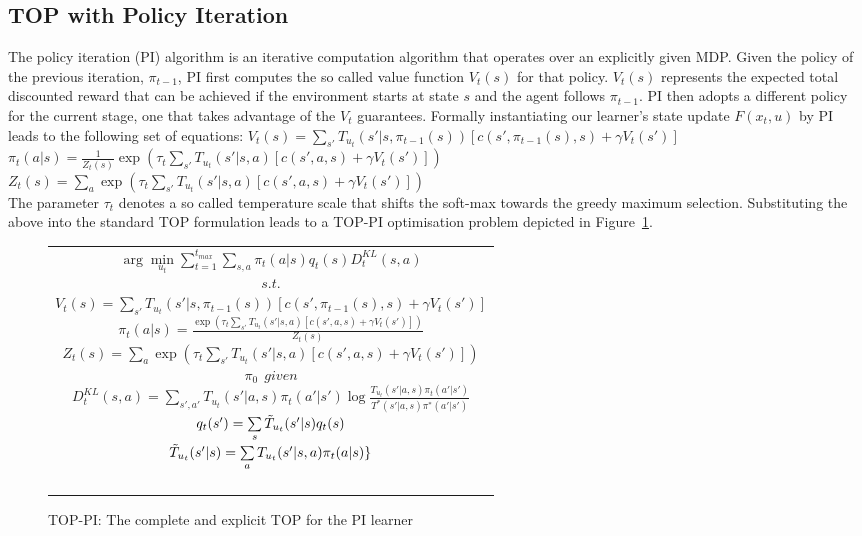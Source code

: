 \documentclass[letterpaper]{aamas2009}
\begin{document}
\subsection{TOP with Policy Iteration}
The policy iteration (PI) algorithm is an iterative computation
algorithm that operates over an explicitly given MDP. Given the policy
of the previous iteration, $\pi_{t-1}$, PI first computes the so
called value function $V_t(s)$ for that policy. $V_t(s)$ represents
the expected total discounted reward that can be achieved if the
environment starts at state $s$ and the agent follows $\pi_{t-1}$. PI
then adopts a different policy for the current stage, one that takes
advantage of the $V_t$ guarantees. Formally instantiating our
learner's state update $F(x_t,u)$ by PI leads to the following set of
equations:
{\center 
$V_t(s)=\sum\limits_{s'}T_{u_t}(s'|s,\pi_{t-1}(s))\left[
c(s',\pi_{t-1}(s),s)+\gamma V_t(s')
\right]$\\
$\pi_t(a|s)=\frac{1}{Z_t(s)}\exp\left(\tau_t\sum\limits_{s'}T_{u_t}(s'|s,a)\left[
c(s',a,s)+\gamma V_t(s')
\right]\right)$\\
$Z_t(s)=\sum\limits_a\exp\left(\tau_t\sum\limits_{s'}T_{u_t}(s'|s,a)\left[
c(s',a,s)+\gamma V_t(s')
\right]\right)$\\
}
The parameter $\tau_t$ denotes a so called temperature scale that
shifts the soft-max towards the greedy maximum selection. Substituting
the above into the standard TOP formulation leads to a TOP-PI
optimisation problem depicted in Figure~\ref{t_opt_PI}.
\begin{figure}[th]
\begin{tabular}{|c|} \hline \parbox{3.2 in} {\center 
$\arg\min\limits_{u_t}\sum\limits_{t=1}^{t_{max}}\sum\limits_{s,a}\pi_t(a|s)q_t(s)D^{KL}_t(s,a)$\\
$s.t.$\\
$V_t(s)=\sum\limits_{s'}T_{u_t}(s'|s,\pi_{t-1}(s))\left[
c(s',\pi_{t-1}(s),s)+\gamma V_t(s')
\right]$\\
$\pi_t(a|s)=\frac{\exp\left(\tau_t\sum\limits_{s'}T_{u_t}(s'|s,a)\left[
c(s',a,s)+\gamma V_t(s')
\right]\right)}{Z_t(s)}$\\
$Z_t(s)=\sum\limits_a\exp\left(\tau_t\sum\limits_{s'}T_{u_t}(s'|s,a)\left[
c(s',a,s)+\gamma V_t(s')
\right]\right)$\\
$\pi_0\ \ \displaystyle{given}$\\
$D^{KL}_t(s,a)=\sum\limits_{s',a'}T_{u_t}(s'|a,s)\pi_t(a'|s')\log\frac{T_{u_t}(s'|a,s)\pi_t(a'|s')}{T^*(s'|a,s)\pi^*(a'|s')}$\\
$q_t(s')=\sum\limits_s\Tilde{T}_{u_t}(s'|s)q_t(s)$\\
$\Tilde{T}_{u_t}(s'|s)=\sum\limits_aT_{u_t}(s'|s,a)\pi_t(a|s)\}$\\\ \\
}\\ \hline \end{tabular}
\caption{\label{t_opt_PI}TOP-PI: The complete and explicit TOP for the
  PI learner}
\end{figure}
\end{document}
